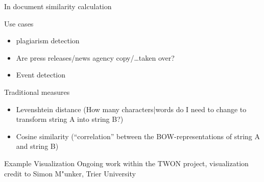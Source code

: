 \documentclass[compress]{beamer}
\begin{document}
%	
%	


\begin{frame}{In document similarity calculation}
	\begin{block}{Use cases}
		\begin{itemize}
			\item plagiarism detection
			\item Are press releases/news agency copy/\ldots taken over?
			\item Event detection
		\end{itemize}
	\end{block}
	\pause
	\begin{block}{Traditional measures}
		\begin{itemize}
			\item Levenshtein distance (How many characters|words do I need to change to transform string A into string B?)
			\item Cosine similarity (``correlation'' between the BOW-representations of string A and string B)
		\end{itemize}
	\end{block}
\end{frame}

\begin{frame}{Example Visualization}
    Ongoing work within the TWON project, visualization credit to Simon M"unker, Trier University
\end{frame}
\end{document}
